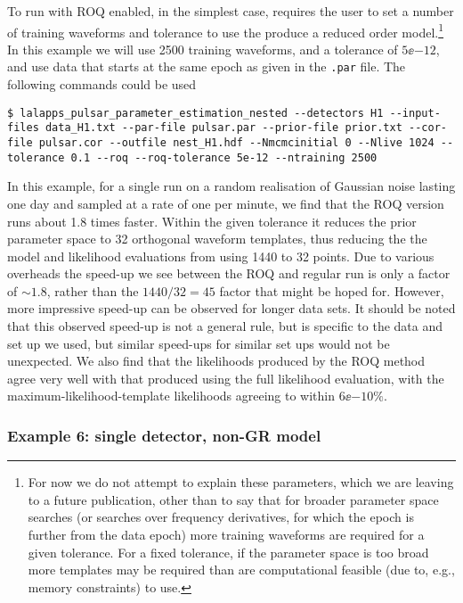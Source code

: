 To run with ROQ enabled, in the simplest case, requires the user to set a number of training waveforms and tolerance to use the produce a reduced order
model.\footnote{For now we do not attempt to explain these parameters, which we are leaving to a future publication, other than to say that for broader
parameter space searches (or searches over frequency derivatives, for which the epoch is further from the data epoch) more training waveforms are required
for a given tolerance. For a fixed tolerance, if the parameter space is too broad more templates may be required than are computational feasible (due to, e.g.,
memory constraints) to use.} In this example we will use 2500 training waveforms, and a tolerance of $5\ee{-12}$, and use data that starts at the same
epoch as given in the {\tt .par} file. The following commands could be used
\begin{lstlisting}[frame=single]
$ lalapps_pulsar_parameter_estimation_nested --detectors H1 --input-files data_H1.txt --par-file pulsar.par --prior-file prior.txt --cor-file pulsar.cor --outfile nest_H1.hdf --Nmcmcinitial 0 --Nlive 1024 --tolerance 0.1 --roq --roq-tolerance 5e-12 --ntraining 2500
\end{lstlisting}

In this example, for a single run on a random realisation of Gaussian noise lasting one day and sampled at a rate of one per minute, we find that the ROQ
version runs about 1.8 times faster. Within the given tolerance it reduces the prior parameter space to 32 orthogonal waveform templates, thus reducing the
the model and likelihood evaluations from using 1440 to 32 points. Due to various overheads the speed-up we see between the ROQ and regular run is only a factor
of $\sim 1.8$, rather than the $1440/32 = 45$ factor that might be hoped for. However, more impressive speed-up can be observed for longer data sets. It should be
noted that this observed speed-up is not a general rule, but is specific to the data and set up we used, but similar speed-ups for similar set ups would not be
unexpected. We also find that the likelihoods produced by the ROQ method agree very well with that produced using the full likelihood evaluation, with the
maximum-likelihood-template likelihoods agreeing to within $6\ee{-10}\%$.

\subsubsection{Example 6: single detector, non-GR model}

